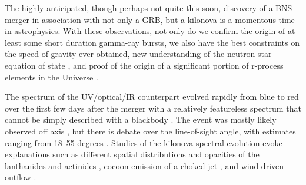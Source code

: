 \documentclass[modern]{aastex61}
\newcommand{\red}[1]{\textcolor{red}{#1}}
\begin{document}
The highly-anticipated, though perhaps not quite this soon, discovery of a BNS merger in association with not only a GRB, but a kilonova is a momentous time in astrophysics. With these observations, not only do we confirm the origin of at least some short duration gamma-ray bursts, we also have the best constraints on the speed of gravity ever obtained, new understanding of the neutron star equation of state \citep{Abbott2017c}, and proof of the origin of a significant portion of r-process elements in the Universe \citep{Chornock2017,Drout2017,Pian2017,Tanvir2017}.

The spectrum of the UV/optical/IR counterpart evolved rapidly from blue to red over the first few days after the merger with a relatively featureless spectrum that cannot be simply described with a blackbody \citep{McCully2017}. The event was mostly likely observed off axis \citep{Troja2017,Abbott2017a}, but there is debate over the line-of-sight angle, with estimates ranging from 18--55 degrees \citep{Mandel2017,Abbott2017a,Kim2017,Haggard2017}.
Studies of the kilonova spectral evolution evoke explanations such as different spatial distributions and opacities of the lanthanides and actinides \citep{McCully2017,Cowperthwaite2017}, cocoon emission of a choked jet \citep{Kasliwal2017}, and wind-driven outflow \citep{Evans2017}. 
\end{document}
